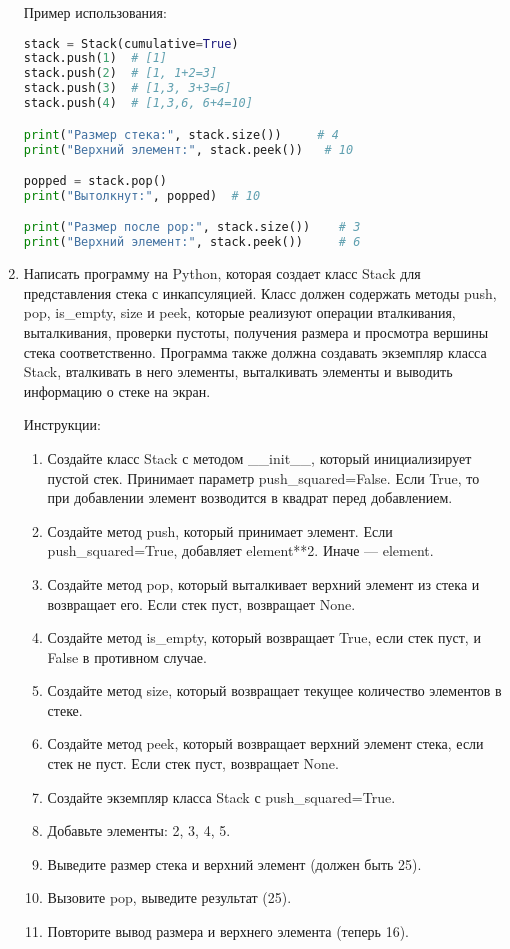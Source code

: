 \begin{enumerate}
Пример использования:
\begin{lstlisting}[language=Python]
stack = Stack(cumulative=True)
stack.push(1)  # [1]
stack.push(2)  # [1, 1+2=3]
stack.push(3)  # [1,3, 3+3=6]
stack.push(4)  # [1,3,6, 6+4=10]

print("Размер стека:", stack.size())     # 4
print("Верхний элемент:", stack.peek())   # 10

popped = stack.pop()
print("Вытолкнут:", popped)  # 10

print("Размер после pop:", stack.size())    # 3
print("Верхний элемент:", stack.peek())     # 6
\end{lstlisting}

\item Написать программу на Python, которая создает класс Stack для представления стека с инкапсуляцией. Класс должен содержать методы push, pop, is\_empty, size и peek, которые реализуют операции вталкивания, выталкивания, проверки пустоты, получения размера и просмотра вершины стека соответственно. Программа также должна создавать экземпляр класса Stack, вталкивать в него элементы, выталкивать элементы и выводить информацию о стеке на экран.

Инструкции:
\begin{enumerate}
    \item Создайте класс Stack с методом \_\_init\_\_, который инициализирует пустой стек. Принимает параметр push\_squared=False. Если True, то при добавлении элемент возводится в квадрат перед добавлением.
    \item Создайте метод push, который принимает элемент. Если push\_squared=True, добавляет element**2. Иначе — element.
    \item Создайте метод pop, который выталкивает верхний элемент из стека и возвращает его. Если стек пуст, возвращает None.
    \item Создайте метод is\_empty, который возвращает True, если стек пуст, и False в противном случае.
    \item Создайте метод size, который возвращает текущее количество элементов в стеке.
    \item Создайте метод peek, который возвращает верхний элемент стека, если стек не пуст. Если стек пуст, возвращает None.
    \item Создайте экземпляр класса Stack с push\_squared=True.
    \item Добавьте элементы: 2, 3, 4, 5.
    \item Выведите размер стека и верхний элемент (должен быть 25).
    \item Вызовите pop, выведите результат (25).
    \item Повторите вывод размера и верхнего элемента (теперь 16).
\end{enumerate}


\end{enumerate}
